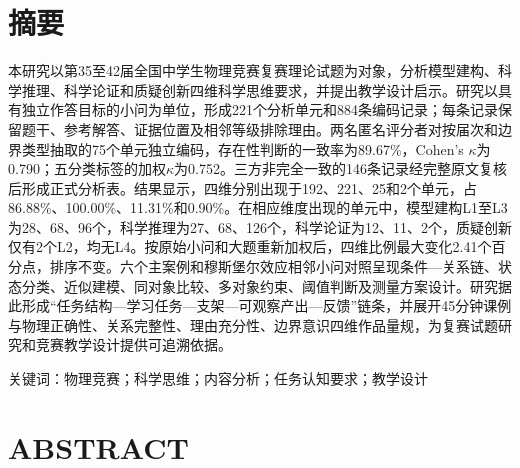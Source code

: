 \documentclass[
  12pt,
  a4paper,twoside,openany]{ctexbook}
\begin{document}
\setcounter{page}{1}
\pagestyle{fancy}
\chapter*{摘要}\label{ux6458ux8981}

本研究以第35至42届全国中学生物理竞赛复赛理论试题为对象，分析模型建构、科学推理、科学论证和质疑创新四维科学思维要求，并提出教学设计启示。研究以具有独立作答目标的小问为单位，形成221个分析单元和884条编码记录；每条记录保留题干、参考解答、证据位置及相邻等级排除理由。两名匿名评分者对按届次和边界类型抽取的75个单元独立编码，存在性判断的一致率为89.67\%，Cohen's
\(\kappa\)为0.790；五分类标签的加权\(\kappa\)为0.752。三方非完全一致的146条记录经完整原文复核后形成正式分析表。结果显示，四维分别出现于192、221、25和2个单元，占86.88\%、100.00\%、11.31\%和0.90\%。在相应维度出现的单元中，模型建构L1至L3为28、68、96个，科学推理为27、68、126个，科学论证为12、11、2个，质疑创新仅有2个L2，均无L4。按原始小问和大题重新加权后，四维比例最大变化2.41个百分点，排序不变。六个主案例和穆斯堡尔效应相邻小问对照呈现条件---关系链、状态分类、近似建模、同对象比较、多对象约束、阈值判断及测量方案设计。研究据此形成``任务结构---学习任务---支架---可观察产出---反馈''链条，并展开45分钟课例与物理正确性、关系完整性、理由充分性、边界意识四维作品量规，为复赛试题研究和竞赛教学设计提供可追溯依据。

关键词：物理竞赛；科学思维；内容分析；任务认知要求；教学设计

\chapter*{ABSTRACT}\begingroup{}\label{abstract}
\end{document}
